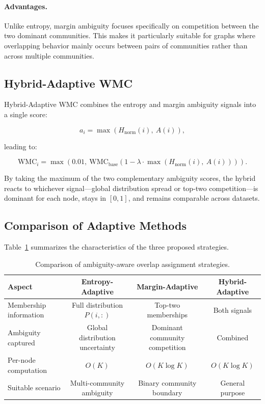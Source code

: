 \documentclass[pdflatex,sn-mathphys-num]{sn-jnl}%
\theoremstyle{thmstyleone}%
\theoremstyle{thmstyletwo}%
\theoremstyle{thmstylethree}%
\begin{document}
\paragraph{Advantages.}

Unlike entropy, margin ambiguity focuses specifically on competition between the two dominant communities.
This makes it particularly suitable for graphs where overlapping behavior mainly occurs between pairs of communities rather than across multiple communities.

\subsection{Hybrid-Adaptive WMC}
\label{subsec:hybrid-adaptive}

Hybrid-Adaptive WMC combines the entropy and margin ambiguity signals into a single score:

\begin{equation}
a_i = \max\left(H_{\mathrm{norm}}(i),\ A(i)\right),
\label{eq:hybrid-score}
\end{equation}

leading to:

\begin{equation}
\mathrm{WMC}_i =
\max\left(0.01,\ \mathrm{WMC}_{\mathrm{base}}
\left(1-\lambda \cdot \max\left(H_{\mathrm{norm}}(i),\ A(i)\right)\right)\right).
\label{eq:hybrid-adaptive}
\end{equation}

By taking the maximum of the two complementary ambiguity scores, the hybrid reacts to whichever signal---global distribution spread or top-two competition---is dominant for each node, stays in $[0,1]$, and remains comparable across datasets.

\subsection{Comparison of Adaptive Methods}
\label{subsec:comparison}

Table~\ref{tab:method-comparison} summarizes the characteristics of the three proposed strategies.
	
\begin{table}[ht]
\centering
\caption{Comparison of ambiguity-aware overlap assignment strategies.}
\label{tab:method-comparison}
\begin{tabular}{lccc}
\toprule
\textbf{Aspect} & \textbf{Entropy-Adaptive} & \textbf{Margin-Adaptive} & \textbf{Hybrid-Adaptive} \\
\midrule
Membership information & Full distribution $P(i,:)$ & Top-two memberships & Both signals \\
Ambiguity captured & Global distribution uncertainty & Dominant community competition & Combined \\
Per-node computation & $O(K)$ & $O(K \log K)$ & $O(K \log K)$ \\
Suitable scenario & Multi-community ambiguity & Binary community boundary & General purpose \\
\bottomrule
\end{tabular}
\end{table}
\end{document}
